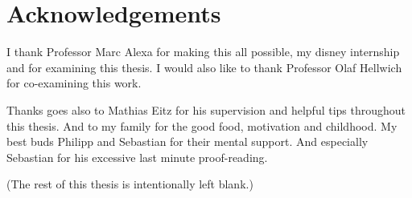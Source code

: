 
\chapter*{Acknowledgements}
\thispagestyle{empty}
I thank Professor Marc Alexa for making this all possible, my disney internship
and for examining this thesis. I would also like to thank Professor Olaf
Hellwich for co-examining this work. 

Thanks goes also to Mathias Eitz for his supervision and helpful tips
throughout this thesis. And to my family for the good food, motivation and
childhood. 
My best buds Philipp and Sebastian for their mental support.
And especially Sebastian for his excessive last minute proof-reading.

\begin{center}
\vspace{30mm}
(The rest of this thesis is intentionally left blank.)
\end{center}



